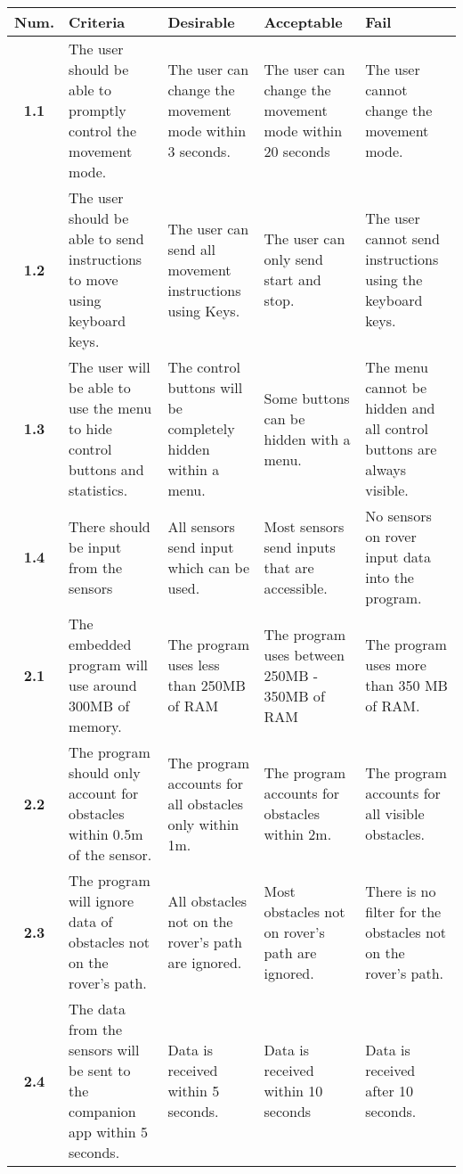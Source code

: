 \documentclass[11pt]{report}
\begin{document}
		\noindent
		\begin{tabularx}{\textwidth}{|S|B|B|B|B|}
			\hline
			\textbf{Num.}     & \textbf{Criteria}     & \textbf{Desirable}    & \textbf{Acceptable} &  \textbf{Fail}	 \\ \hline
			\textbf{1.1} & The user should be able to promptly control the movement mode.        &  The user can change the movement mode within 3 seconds.  & The user can change the movement mode within 20 seconds & The user cannot change the movement mode.      \\ \hline
			\textbf{1.2} & The user should be able to send instructions to move using keyboard keys.        & The user can send all movement instructions using Keys.	&	The user can only send start and stop.	&   The user cannot send instructions using the keyboard keys.      \\ \hline
			\textbf{1.3} & The user will be able to use the menu to hide control buttons and statistics. & The control buttons will be completely hidden within a menu.	&	Some buttons can be hidden with a menu.	& The menu cannot be hidden and all control buttons are always visible.	 \\ \hline
			\textbf{1.4} & There should be input from the sensors & All sensors send input which can be used. 	&	Most sensors send inputs that are accessible.	&	No sensors on rover input data into the program. \\ \hline  
			
			\textbf{2.1} & The embedded program will use around 300MB of memory.        &  The program uses less than 250MB of RAM  & The program uses between 250MB - 350MB of RAM &   The program uses more than 350 MB of RAM.    \\ \hline
			\textbf{2.2} & The program should only account for obstacles within 0.5m of the sensor.        & The program accounts for all obstacles only within 1m.	&	The program accounts for obstacles within 2m.	&  The program accounts for all visible obstacles.       \\ \hline
			\textbf{2.3} & The program will ignore data of obstacles not on the rover's path. & All obstacles not on the rover's path are ignored.	&	Most obstacles not on rover's path are ignored. 	&	There is no filter for the obstacles not on the rover's path. \\ \hline
			\textbf{2.4} & The data from the sensors will be sent to the companion app within 5 seconds. & Data is received within 5 seconds. 	&	Data is received within 10 seconds	&	Data is received after 10 seconds. \\ \hline  
		\end{tabularx}
		
\end{document}
